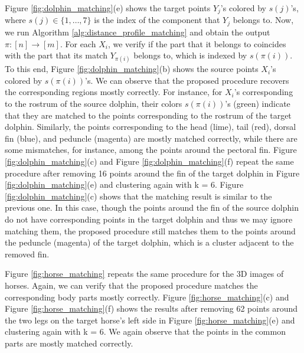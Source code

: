 \documentclass[11pt,letterpaper]{article}
\theoremstyle{definition}
\numberwithin{equation}{section}
\begin{document}
Figure \ref{fig:dolphin_matching}(e) shows the target points $Y_j$'s colored by $s(j)$'s, where $s(j) \in \{1, \ldots, 7\}$ is the index of the component that $Y_j$ belongs to. Now, we run Algorithm \ref{alg:distance_profile_matching} and obtain the output $\pi \colon [n] \to [m]$. For each $X_i$, we verify if the part that it belongs to coincides with the part that its match $Y_{\pi(i)}$ belongs to, which is indexed by $s(\pi(i))$. To this end, Figure \ref{fig:dolphin_matching}(b) shows the source points $X_i$'s colored by $s(\pi(i))$'s. We can observe that the proposed procedure recovers the corresponding regions mostly correctly. For instance, for $X_i$'s corresponding to the rostrum of the source dolphin, their colors $s(\pi(i))$'s (green) indicate that they are matched to the points corresponding to the rostrum of the target dolphin. Similarly, the points corresponding to the head (lime), tail (red), dorsal fin (blue), and peduncle (magenta) are mostly matched correctly, while there are some mismatches, for instance, among the points around the pectoral fin. Figure \ref{fig:dolphin_matching}(c) and Figure \ref{fig:dolphin_matching}(f) repeat the same procedure after removing 16 points around the fin of the target dolphin in Figure \ref{fig:dolphin_matching}(e) and clustering again with k = $6$. Figure \ref{fig:dolphin_matching}(c) shows that the matching result is similar to the previous one. In this case, though the points around the fin of the source dolphin do not have corresponding points in the target dolphin and thus we may ignore matching them, the proposed procedure still matches them to the points around the peduncle (magenta) of the target dolphin, which is a cluster adjacent to the removed fin. 

Figure \ref{fig:horse_matching} repeats the same procedure for the 3D images of horses. Again, we can verify that the proposed procedure matches the corresponding body parts mostly correctly. Figure \ref{fig:horse_matching}(c) and Figure \ref{fig:horse_matching}(f) shows the results after removing 62 points around the two legs on the target horse's left side in Figure \ref{fig:horse_matching}(e) and clustering again with k = $6$. We again observe that the points in the common parts are mostly matched correctly.
\end{document}
